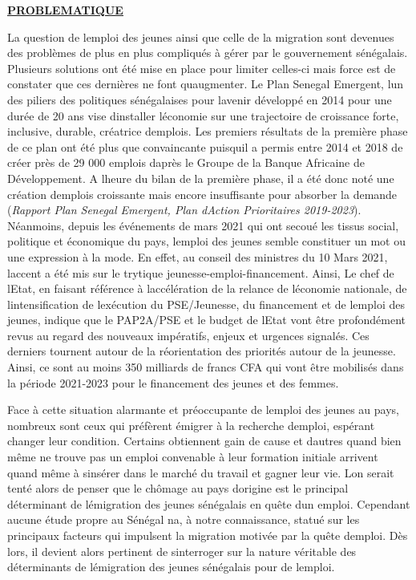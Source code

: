 \documentclass[
  letterpaper,
  DIV=11,
  numbers=noendperiod]{scrartcl}
\begin{document}
\ul{\textbf{PROBLEMATIQUE}}

La question de l\textquotesingle emploi des jeunes ainsi que celle de la
migration sont devenues des problèmes de plus en plus compliqués à gérer
par le gouvernement sénégalais. Plusieurs solutions ont été mise en
place pour limiter celles-ci mais force est de constater que ces
dernières ne font qu\textquotesingle augmenter. Le Plan Senegal
Emergent, l\textquotesingle un des piliers des politiques sénégalaises
pour l\textquotesingle avenir développé en 2014 pour une durée de 20 ans
vise d\textquotesingle installer l\textquotesingle économie sur une
trajectoire de croissance forte, inclusive, durable, créatrice
d\textquotesingle emplois. Les premiers résultats de la première phase
de ce plan ont été plus que convaincante puisqu\textquotesingle il a
permis entre 2014 et 2018 de créer près de 29 000 emplois
d\textquotesingle après le Groupe de la Banque Africaine de
Développement. A l\textquotesingle heure du bilan de la première phase,
il a été donc noté une création d\textquotesingle emplois croissante
mais encore insuffisante pour absorber la demande (\emph{Rapport Plan
Senegal Emergent, Plan d\textquotesingle Action Prioritaires
2019-2023}). Néanmoins, depuis les événements de mars 2021 qui ont
secoué les tissus social, politique et économique du pays,
l\textquotesingle emploi des jeunes semble constituer un mot ou une
expression à la mode. En effet, au conseil des ministres du 10 Mars
2021, l\textquotesingle accent a été mis sur le trytique
jeunesse-emploi-financement. Ainsi, Le chef de l\textquotesingle Etat,
en faisant référence à l\textquotesingle accélération de la relance de
l\textquotesingle économie nationale, de
l\textquotesingle intensification de l\textquotesingle exécution du
PSE/Jeunesse, du financement et de l\textquotesingle emploi des jeunes,
indique que le PAP2A/PSE et le budget de l\textquotesingle Etat vont
être profondément revus au regard des nouveaux impératifs, enjeux et
urgences signalés. Ces derniers tournent autour de la réorientation des
priorités autour de la jeunesse. Ainsi, ce sont au moins 350 milliards
de francs CFA qui vont être mobilisés dans la période 2021-2023 pour le
financement des jeunes et des femmes.

Face à cette situation alarmante et préoccupante de
l\textquotesingle emploi des jeunes au pays, nombreux sont ceux qui
préfèrent émigrer à la recherche d\textquotesingle emploi, espérant
changer leur condition. Certains obtiennent gain de cause et
d\textquotesingle autres quand bien même ne trouve pas un emploi
convenable à leur formation initiale arrivent quand même à
s\textquotesingle insérer dans le marché du travail et gagner leur vie.
L\textquotesingle on serait tenté alors de penser que le chômage au pays
d\textquotesingle origine est le principal déterminant de
l\textquotesingle émigration des jeunes sénégalais en quête
d\textquotesingle un emploi. Cependant aucune étude propre au Sénégal
n\textquotesingle a, à notre connaissance, statué sur les principaux
facteurs qui impulsent la migration motivée par la quête
d\textquotesingle emploi. Dès lors, il devient alors pertinent de
s\textquotesingle interroger sur la nature véritable des déterminants de
l\textquotesingle émigration des jeunes sénégalais pour de
l\textquotesingle emploi.
\end{document}
